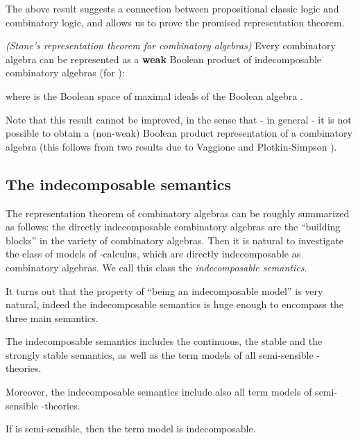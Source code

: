 \documentclass[english]{llncs}
\begin{document}
The above result suggests a connection between propositional classic logic and combinatory logic,
and allows us to prove the promised representation theorem.

\begin{theorem} \cite[Thm.~4.3.7]{ManzonettoTh} {\em (Stone's representation theorem for combinatory algebras)}
Every combinatory algebra  can be represented as a {\bf weak} Boolean product of indecomposable combinatory algebras  (for ):

where  is the Boolean space of maximal ideals of the Boolean algebra .
\end{theorem}

Note that this result cannot be improved, in the sense that - in general - it is not possible to obtain a (non-weak) Boolean product 
representation of a combinatory algebra (this follows from two results due to Vaggione \cite{Vaggione96a} and Plotkin-Simpson \cite[Lemma~3.14]{SelingerTh}).

\subsection{The indecomposable semantics} 

The representation theorem of combinatory algebras can be roughly summarized as follows: 
the directly indecomposable combinatory algebras are the ``building blocks'' in the variety of combinatory algebras.
Then it is natural to investigate the class of models of -calculus, which are directly indecomposable
as combinatory algebras. We call this class the {\em indecomposable semantics}.

It turns out that the property of ``being an indecomposable model'' is very natural, indeed
the indecomposable semantics is huge enough to encompass the three main semantics. 

\begin{theorem}\cite[Cor.~4.4.9]{ManzonettoTh} The indecomposable semantics includes the continuous, the stable and the strongly stable semantics, as well as the term models 
of all semi-sensible -theories.
\end{theorem}

Moreover, the indecomposable semantics include also all term models of semi-sensible -theories.

\begin{theorem}\cite[Thm.~4.4.7]{ManzonettoTh} If  is semi-sensible, then the term model  is indecomposable.
\end{theorem}
\end{document}
